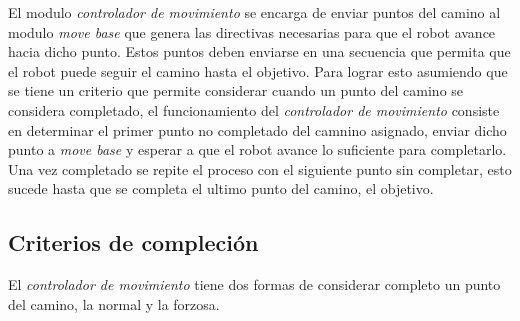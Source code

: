 





El modulo \emph{controlador de movimiento} se encarga de enviar puntos del
camino al modulo \emph{move base} que genera las directivas necesarias para que
el robot avance hacia dicho punto. Estos puntos deben enviarse en una secuencia
que permita que el robot puede seguir el camino hasta el objetivo. Para lograr
esto asumiendo que se tiene un criterio que permite considerar cuando un punto del camino se
considera completado, el funcionamiento del \emph{controlador de
movimiento} consiste en determinar el primer punto no completado del camnino
asignado, enviar dicho punto a \emph{move base} y esperar a que el robot avance
lo suficiente para completarlo. Una vez completado se repite el
proceso con el siguiente punto sin completar, esto sucede hasta que se completa
el ultimo punto del camino, el objetivo.


\subsection{Criterios de compleción}

El \emph{controlador de movimiento} tiene dos formas de considerar completo un
punto del camino, la normal y la forzosa.

